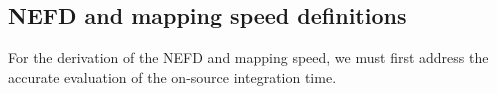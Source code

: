 
\subsection{NEFD and mapping speed definitions}
\label{se:integration_time}


For the derivation of the NEFD and mapping speed, we must first
address the accurate evaluation of the on-source integration time. 


